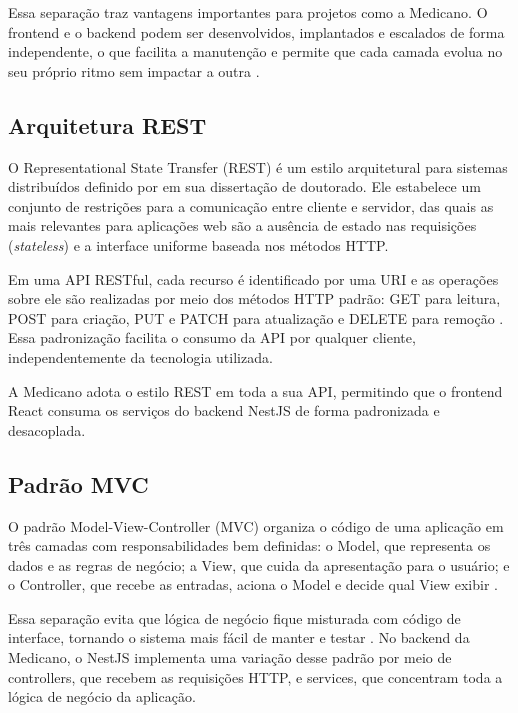 Essa separação traz vantagens importantes para projetos
como a Medicano. O frontend e o backend podem ser
desenvolvidos, implantados e escalados de forma
independente, o que facilita a manutenção e permite que
cada camada evolua no seu próprio ritmo sem impactar
a outra \cite{sommerville2011}.

\subsection{Arquitetura REST}
\label{subsec:rest}

O Representational State Transfer (REST) é um estilo
arquitetural para sistemas distribuídos definido por
 em sua dissertação de doutorado.
Ele estabelece um conjunto de restrições para a comunicação
entre cliente e servidor, das quais as mais relevantes
para aplicações web são a ausência de estado nas
requisições (\textit{stateless}) e a interface uniforme
baseada nos métodos HTTP.

Em uma API RESTful, cada recurso é identificado por uma
URI e as operações sobre ele são realizadas por meio dos
métodos HTTP padrão: GET para leitura, POST para criação,
PUT e PATCH para atualização e DELETE para remoção
\cite{fielding2000}. Essa padronização facilita o
consumo da API por qualquer cliente, independentemente
da tecnologia utilizada.

A Medicano adota o estilo REST em toda a sua API,
permitindo que o frontend React consuma os serviços
do backend NestJS de forma padronizada e desacoplada.

\subsection{Padrão MVC}
\label{subsec:mvc}

O padrão Model-View-Controller (MVC) organiza o código
de uma aplicação em três camadas com responsabilidades
bem definidas: o Model, que representa os dados e as
regras de negócio; a View, que cuida da apresentação
para o usuário; e o Controller, que recebe as entradas,
aciona o Model e decide qual View exibir
\cite{sommerville2011}.

Essa separação evita que lógica de negócio fique misturada
com código de interface, tornando o sistema mais fácil
de manter e testar \cite{martin2017}. No backend da
Medicano, o NestJS implementa uma variação desse padrão
por meio de controllers, que recebem as requisições HTTP,
e services, que concentram toda a lógica de negócio da
aplicação.

